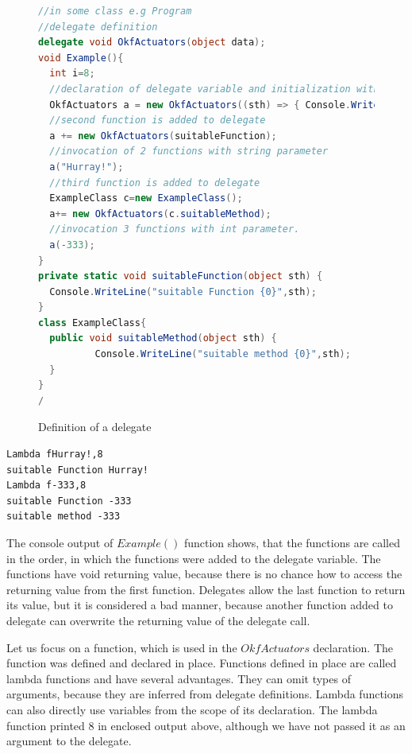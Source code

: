 \begin{figure}[!hbp]
\begin{lstlisting}[language=cs]
//in some class e.g Program
//delegate definition
delegate void OkfActuators(object data);
void Example(){
  int i=8;
  //declaration of delegate variable and initialization with lambda function
  OkfActuators a = new OkfActuators((sth) => { Console.WriteLine("Lambda f{0},{1}",sth,i); });
  //second function is added to delegate
  a += new OkfActuators(suitableFunction);
  //invocation of 2 functions with string parameter
  a("Hurray!");
  //third function is added to delegate
  ExampleClass c=new ExampleClass();
  a+= new OkfActuators(c.suitableMethod);
  //invocation 3 functions with int parameter.
  a(-333);
}
private static void suitableFunction(object sth) { 
  Console.WriteLine("suitable Function {0}",sth);
}
class ExampleClass{
  public void suitableMethod(object sth) { 	
          Console.WriteLine("suitable method {0}",sth);	
  }
}
/\end{lstlisting}
\caption{Definition of a delegate} \label{deleg}
\end{figure}

\begin{verbatim}
Lambda fHurray!,8
suitable Function Hurray!
Lambda f-333,8
suitable Function -333
suitable method -333
\end{verbatim}

  The console output of $Example()$ function shows, that the functions are called in the order, in
  which the functions were added to the delegate variable. 
  The functions have void returning value, because there is no chance how to access
  the returning value from the first function. Delegates allow the last function to return its value, 
  but it is considered a bad manner, because
  another function added to delegate can overwrite the returning value of the delegate call.

  Let us focus on a function, which is used in the $OkfActuators$ declaration. The function 
  was defined and declared in place. Functions defined in place are called lambda functions 
  and have several advantages. 
  They can omit types of arguments, because they are inferred from delegate definitions. Lambda functions
  can also directly use variables from the scope of its declaration. The lambda function printed 8 in enclosed output above,
  although we have not passed it as an argument to the delegate.

